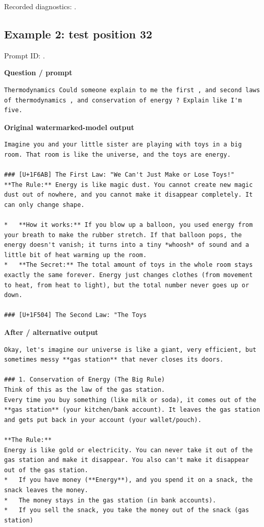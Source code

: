Recorded diagnostics:
\texttt{}.

\subsection{Example 2: test position
32}\label{record-docs-watermarking-qualitative-text-textseal2-smoothing-md-example-2-test-position-32}

Prompt ID:
\texttt{}.

\textbf{Question / prompt}

\begin{Verbatim}
Thermodynamics Could someone explain to me the first , and second laws of thermodynamics , and conservation of energy ? Explain like I'm five.
\end{Verbatim}

\textbf{Original watermarked-model output}

\begin{Verbatim}
Imagine you and your little sister are playing with toys in a big room. That room is like the universe, and the toys are energy.

### [U+1F6AB] The First Law: "We Can't Just Make or Lose Toys!"
**The Rule:** Energy is like magic dust. You cannot create new magic dust out of nowhere, and you cannot make it disappear completely. It can only change shape.

*   **How it works:** If you blow up a balloon, you used energy from your breath to make the rubber stretch. If that balloon pops, the energy doesn't vanish; it turns into a tiny *whoosh* of sound and a little bit of heat warming up the room.
*   **The Secret:** The total amount of toys in the whole room stays exactly the same forever. Energy just changes clothes (from movement to heat, from heat to light), but the total number never goes up or down.

### [U+1F504] The Second Law: "The Toys
\end{Verbatim}

\textbf{After / alternative output}

\begin{Verbatim}
Okay, let's imagine our universe is like a giant, very efficient, but sometimes messy **gas station** that never closes its doors.

### 1. Conservation of Energy (The Big Rule)
Think of this as the law of the gas station.
Every time you buy something (like milk or soda), it comes out of the **gas station** (your kitchen/bank account). It leaves the gas station and gets put back in your account (your wallet/pouch).

**The Rule:**
Energy is like gold or electricity. You can never take it out of the gas station and make it disappear. You also can't make it disappear out of the gas station.
*   If you have money (**Energy**), and you spend it on a snack, the snack leaves the money.
*   The money stays in the gas station (in bank accounts).
*   If you sell the snack, you take the money out of the snack (gas station)
\end{Verbatim}


